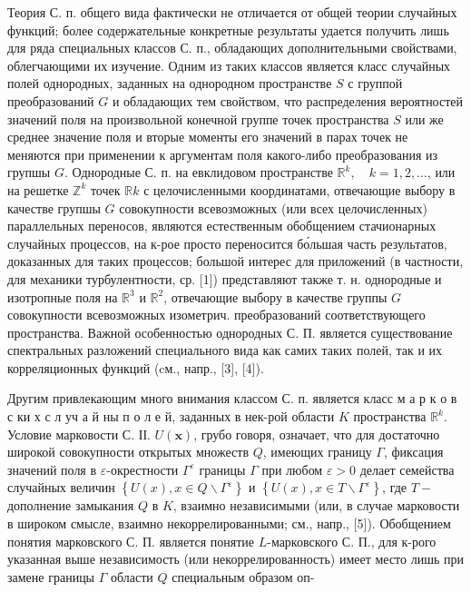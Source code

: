 \documentclass[10pt]{article}
\begin{document}
Теория С. п. общего вида фактически не отличается от общей теории случайных функций; более содержательные конкретные результаты удается получить лишь для ряда специальных классов С. п., обладающих дополнительными свойствами, облегчающими их изучение. Одним из таких классов является класс случайных полей однородных, заданных на однородном пространстве $S$ с группой преобразований $G$ и обладающих тем свойством, что распределения вероятностей значений поля на произвольной конечной группе точек пространства $S$ или же среднее значение поля и вторые моменты его значений в парах точек не меняются при применении к аргументам поля какого-либо преобразования из групшы $G$. Однородные С. п. на евклидовом пространстве $\mathbb{R}^{k}, \quad k=1,2, \ldots$, или на решетке $\mathbb{Z}^{k}$ точек $\mathbb{R} k$ с целочисленными координатами, отвечающие выбору в качестве групшы $G$ совокупности всевозможных (или всех целочисленных) параллельных переносов, являются естественным обобщением стачионарных случайных процессов, на к-рое просто переносится бо́льшая часть результатов, доказанных для таких процессов; большой интерес для приложений (в частности, для механики турбулентности, ср. [1]) представляют также т. н. однородные и изотропные поля на $\mathbb{R}^{3}$ и $\mathbb{R}^{2}$, отвечающие выбору в качестве группы $G$ совокупности всевозможных изометрич. преобразований соответствующего пространства. Важной особенностью однородных С. П. является существование спектральных разложений специального вида как самих таких полей, так и их корреляционных функций (cм., напр., [3], [4]).



Другим привлекающим много внимания классом С. п. является класс м а р к о в с ки х с л уч а й ны п о л е й, заданных в нек-рой области $K$ пространства $\mathbb{R}^{k}$. Условие марковости С. ІІ. $U(\boldsymbol{x})$, грубо говоря, означает, что для достаточно широкой совокупности открытых множеств $Q$, имеющих границу $\Gamma$, фиксация значений поля в $\varepsilon$-окрестности $\Gamma^{\varepsilon}$ границы $\Gamma$ при любом $\varepsilon>0$ делает семейства случайных величин $\left\{U(x), x \in Q \backslash \Gamma^{\varepsilon}\right\}$ и $\left\{U(x), x \in T \backslash \Gamma^{\varepsilon}\right\}$, где $T-$ дополнение замыкания $Q$ в $K$, взаимно независимыми (или, в случае марковости в широком смысле, взаимно некоррелированными; см., напр., [5]). Обобщением понятия марковского С. П. является понятие $L$-марковского С. П., для к-рого указанная выше независимость (или некоррелированность) имеет место лишь при замене границы $\Gamma$ области $Q$ специальным образом оп-
\end{document}
